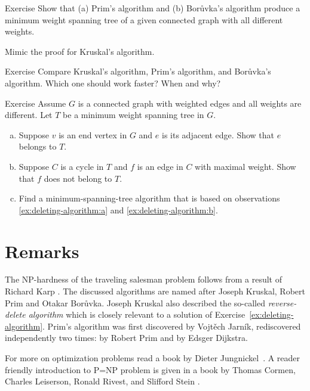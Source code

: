 \begin{thm}{Exercise}
Show that (a) Prim's algorithm and (b) Borůvka's algorithm produce a minimum weight spanning tree of a given connected graph with all different weights.
\end{thm}

 Mimic the proof for Kruskal’s algorithm.

\begin{thm}{Exercise}
Compare Kruskal’s algorithm, Prim's algorithm, and Borůvka's algorithm.
Which one should work faster?
When and why?
\end{thm}

\begin{thm}{Exercise}\label{ex:deleting-algorithm}
Assume $G$ is a connected graph with weighted edges and all weights are different.
Let $T$ be a minimum weight spanning tree in $G$.
\begin{enumerate}[(a)]
\item\label{ex:deleting-algorithm:a} Suppose $v$ is an end vertex in $G$ and $e$ is its adjacent edge.
Show that $e$ belongs to $T$.
\item\label{ex:deleting-algorithm:b} Suppose $C$ is a cycle in $T$ and $f$ is an edge in $C$ with maximal weight.
Show that $f$ does not belong to $T$.
\item Find a minimum-spanning-tree algorithm that is based on observations \ref{ex:deleting-algorithm:a} and \ref{ex:deleting-algorithm:b}.
\end{enumerate}
\end{thm}

\section*{Remarks}

The NP-hardness of the traveling salesman problem follows from a result of Richard Karp \cite{karp}.
The discussed algorithms are named after Joseph Kruskal, Robert Prim and Otakar Borůvka.
Joseph Kruskal also described the so-called \emph{reverse-delete algorithm} \cite{kruskal} which is closely relevant to a solution of Exercise~\ref{ex:deleting-algorithm}.
Prim's algorithm was first discovered by Vojtěch Jarník,
rediscovered  independently two times: by Robert Prim and by Edsger Dijkstra.

For more on optimization problems read a book by Dieter Jungnickel~\cite{jungnickel}.
A reader friendly introduction to P=NP problem is given in a book by 
Thomas Cormen,
Charles Leiserson,
Ronald Rivest, and
Slifford Stein \cite[Chapter 34]{cormen-leiserson-rivest-stein}.


